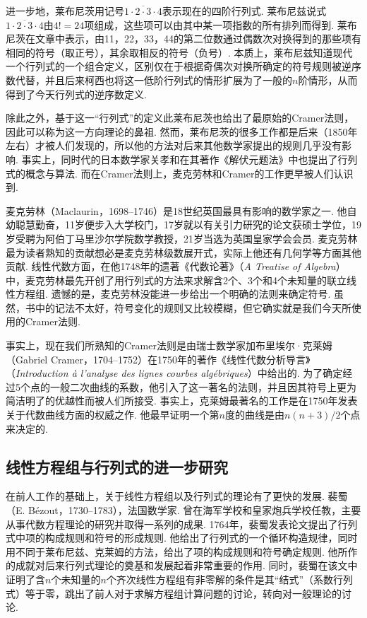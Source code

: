 进一步地，莱布尼茨用记号$\overline{1\cdot 2\cdot 3\cdot 4}$表示现在的四阶行列式. 莱布尼兹说式$\overline{1\cdot 2\cdot 3\cdot 4}$由$4!=24$项组成，这些项可以由其中某一项指数的所有排列而得到. 莱布尼茨在文章中表示，由11，22，33，44的第二位数通过偶数次对换得到的那些项有相同的符号（取正号），其余取相反的符号（负号）. 本质上，莱布尼兹知道现代一个行列式的一个组合定义，区别仅在于根据奇偶次对换所确定的符号规则被逆序数代替，并且后来柯西也将这一低阶行列式的情形扩展为了一般的$n$阶情形，从而得到了今天行列式的逆序数定义.

除此之外，基于这一``行列式''的定义此莱布尼茨也给出了最原始的Cramer法则，因此可以称为这一方向理论的鼻祖. 然而，莱布尼茨的很多工作都是后来（1850年左右）才被人们发现的，所以他的方法对后来其他数学家提出的规则几乎没有影响. 事实上，同时代的日本数学家关孝和在其著作《解伏元题法》中也提出了行列式的概念与算法. 而在Cramer法则上，麦克劳林和Cramer的工作更早被人们认识到.

麦克劳林（Maclaurin，1698--1746）是18世纪英国最具有影响的数学家之一. 他自幼聪慧勤奋，11岁便步入大学校门，17岁就以有关引力研究的论文获硕士学位，19岁受聘为阿伯丁马里沙尔学院数学教授，21岁当选为英国皇家学会会员. 麦克劳林最为读者熟知的贡献想必是麦克劳林级数展开式，实际上他还有几何学等方面其他贡献. 线性代数方面，在他1748年的遗著《代数论著》（\emph{A Treatise of Algebra}）中，麦克劳林最先开创了用行列式的方法来求解含2个、3个和4个未知量的联立线性方程组. 遗憾的是，麦克劳林没能进一步给出一个明确的法则来确定符号. 虽然，书中的记法不太好，符号变化的规则又比较模糊，但它确实就是我们今天所使用的Cramer法则.

事实上，现在我们所熟知的Cramer法则是由瑞士数学家加布里埃尔·克莱姆（Gabriel Cramer，1704--1752）在1750年的著作《线性代数分析导言》（\emph{Introduction à l'analyse des lignes courbes algébriques}）中给出的. 为了确定经过5个点的一般二次曲线的系数，他引入了这一著名的法则，并且因其符号上更为简洁明了的优越性而被人们所接受. 事实上，克莱姆最著名的工作是在1750年发表关于代数曲线方面的权威之作. 他最早证明一个第$n$度的曲线是由$n(n + 3)/2$个点来决定的.

\subsection{线性方程组与行列式的进一步研究}

在前人工作的基础上，关于线性方程组以及行列式的理论有了更快的发展. 裴蜀（E. Bézout，1730--1783），法国数学家. 曾在海军学校和皇家炮兵学校任教，主要从事代数方程理论的研究并取得一系列的成果. 1764年，裴蜀发表论文提出了行列式中项的构成规则和符号的形成规则. 他给出了行列式的一个循环构造规律，同时用不同于莱布尼兹、克莱姆的方法，给出了项的构成规则和符号确定规则. 他所作的成就对后来行列式理论的奠基和发展起着非常重要的作用. 同时，裴蜀在该文中证明了含$n$个未知量的$n$个齐次线性方程组有非零解的条件是其``结式''（系数行列式）等于零，跳出了前人对于求解方程组计算问题的讨论，转向对一般理论的讨论.

